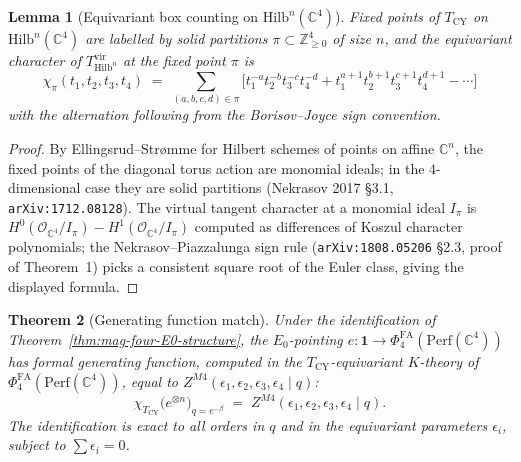\documentclass[11pt]{article}
\providecommand{\C}{\mathbb{C}}
\providecommand{\Z}{\mathbb{Z}}
\providecommand{\cO}{\mathcal{O}}
\providecommand{\Perf}{\mathrm{Perf}}
\providecommand{\Hilb}{\mathrm{Hilb}}
\providecommand{\Ezero}{E_0}
\providecommand{\PhiFA}{\Phi^{\mathrm{FA}}}
\newtheorem{theorem}{Theorem}[section]
\newtheorem{lemma}[theorem]{Lemma}
\theoremstyle{definition}
\begin{document}
\begin{lemma}[Equivariant box counting on $\Hilb^n(\C^4)$]
\label{lem:box-counting}
Fixed points of $T_{\mathrm{CY}}$ on $\Hilb^n(\C^4)$ are labelled by
solid partitions $\pi \subset \Z^4_{\geq 0}$ of size $n$, and the
equivariant character of $T^{\mathrm{vir}}_{\Hilb^n}$ at the fixed
point $\pi$ is
\[
  \chi_\pi(t_1, t_2, t_3, t_4)
  \;=\; \sum_{(a, b, c, d) \in \pi}
    \Big[ t_1^{-a} t_2^{-b} t_3^{-c} t_4^{-d}
        + t_1^{a+1} t_2^{b+1} t_3^{c+1} t_4^{d+1}
        - \cdots \Big]
\]
with the alternation following from the Borisov--Joyce sign convention.
\end{lemma}

\begin{proof}
By Ellingsrud--Str\o mme for Hilbert schemes of points on affine
$\C^n$, the fixed points of the diagonal torus action are monomial
ideals; in the $4$-dimensional case they are solid partitions
(Nekrasov 2017 \S 3.1, \texttt{arXiv:1712.08128}). The virtual tangent
character at a monomial ideal $I_\pi$ is
$H^0(\cO_{\C^4}/I_\pi) - H^1(\cO_{\C^4}/I_\pi)$ computed as
differences of Koszul character polynomials; the
Nekrasov--Piazzalunga sign rule (\texttt{arXiv:1808.05206} \S 2.3,
proof of Theorem~1) picks a consistent square root of the
Euler class, giving the displayed formula.
\end{proof}

\begin{theorem}[Generating function match]
\label{thm:mag-four-partition-match}
Under the identification of
Theorem~\ref{thm:mag-four-E0-structure}, the
$\Ezero$-pointing
$e : \mathbf{1} \to \PhiFA_4(\Perf(\C^4))$
has formal generating function, computed in the $T_{\mathrm{CY}}$-equivariant
$K$-theory of $\PhiFA_4(\Perf(\C^4))$, equal to
$Z^{M4}(\epsilon_1, \epsilon_2, \epsilon_3, \epsilon_4 \mid q)$:
\[
  \chi_{T_{\mathrm{CY}}}\!\bigl(e^{\otimes n}\bigr)_{q = e^{-\beta}}
  \;=\; Z^{M4}(\epsilon_1, \epsilon_2, \epsilon_3, \epsilon_4 \mid q).
\]
The identification is exact to all orders in $q$ and in the equivariant
parameters $\epsilon_i$, subject to $\sum \epsilon_i = 0$.
\end{theorem}
\end{document}
